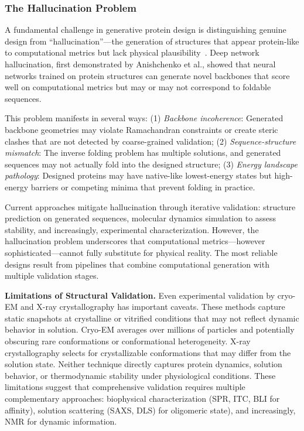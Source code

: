 \subsubsection{The Hallucination Problem}

A fundamental challenge in generative protein design is distinguishing genuine design from ``hallucination''---the generation of structures that appear protein-like to computational metrics but lack physical plausibility~\citep{anishchenko2021hallucination}. Deep network hallucination, first demonstrated by Anishchenko et al., showed that neural networks trained on protein structures can generate novel backbones that score well on computational metrics but may or may not correspond to foldable sequences.

This problem manifests in several ways: (1) \textit{Backbone incoherence}: Generated backbone geometries may violate Ramachandran constraints or create steric clashes that are not detected by coarse-grained validation; (2) \textit{Sequence-structure mismatch}: The inverse folding problem has multiple solutions, and generated sequences may not actually fold into the designed structure; (3) \textit{Energy landscape pathology}: Designed proteins may have native-like lowest-energy states but high-energy barriers or competing minima that prevent folding in practice.

Current approaches mitigate hallucination through iterative validation: structure prediction on generated sequences, molecular dynamics simulation to assess stability, and increasingly, experimental characterization. However, the hallucination problem underscores that computational metrics---however sophisticated---cannot fully substitute for physical reality. The most reliable designs result from pipelines that combine computational generation with multiple validation stages.

\vspace{0.5em}
\noindent
\textbf{Limitations of Structural Validation.} Even experimental validation by cryo-EM and X-ray crystallography has important caveats. These methods capture static snapshots at crystalline or vitrified conditions that may not reflect dynamic behavior in solution. Cryo-EM averages over millions of particles and potentially obscuring rare conformations or conformational heterogeneity. X-ray crystallography selects for crystallizable conformations that may differ from the solution state. Neither technique directly captures protein dynamics, solution behavior, or thermodynamic stability under physiological conditions. These limitations suggest that comprehensive validation requires multiple complementary approaches: biophysical characterization (SPR, ITC, BLI for affinity), solution scattering (SAXS, DLS) for oligomeric state), and increasingly, NMR for dynamic information.


